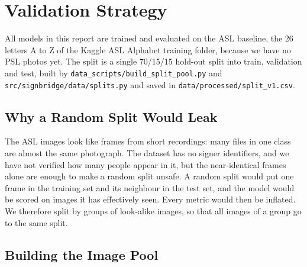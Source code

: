 \section{Validation Strategy}
\label{sec:validation}
\label{sec:validation-strategy}

All models in this report are trained and evaluated on the ASL baseline, the 26 letters A to Z of the Kaggle ASL Alphabet training folder, because we have no PSL photos yet. The split is a single 70/15/15 hold-out split into train, validation and test, built by \texttt{data\_scripts/build\_split\_pool.py} and \texttt{src/signbridge/data/splits.py} and saved in \texttt{data/processed/split\_v1.csv}.

\subsection{Why a Random Split Would Leak}

The ASL images look like frames from short recordings: many files in one class are almost the same photograph. The dataset has no signer identifiers, and we have not verified how many people appear in it, but the near-identical frames alone are enough to make a random split unsafe. A random split would put one frame in the training set and its neighbour in the test set, and the model would be scored on images it has effectively seen. Every metric would then be inflated. We therefore split by groups of look-alike images, so that all images of a group go to the same split.

\subsection{Building the Image Pool}

